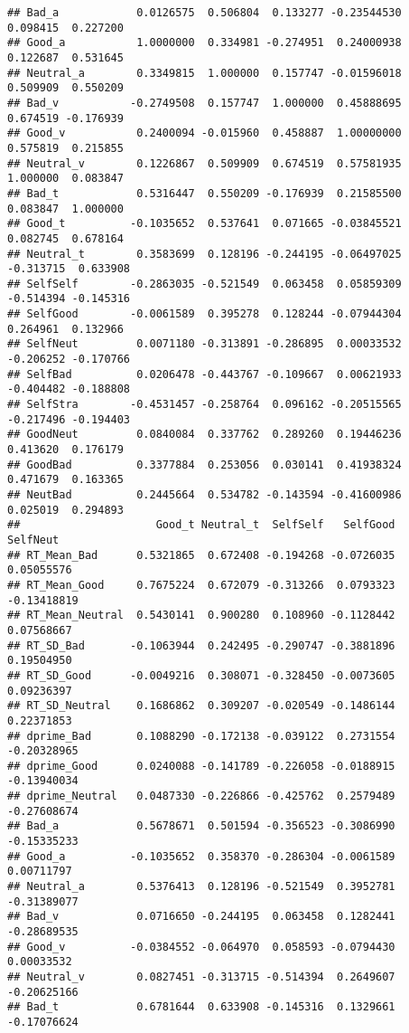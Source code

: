 \documentclass[man]{apa6}
\begin{document}
\begin{verbatim}
## Bad_a            0.0126575  0.506804  0.133277 -0.23544530  0.098415  0.227200
## Good_a           1.0000000  0.334981 -0.274951  0.24000938  0.122687  0.531645
## Neutral_a        0.3349815  1.000000  0.157747 -0.01596018  0.509909  0.550209
## Bad_v           -0.2749508  0.157747  1.000000  0.45888695  0.674519 -0.176939
## Good_v           0.2400094 -0.015960  0.458887  1.00000000  0.575819  0.215855
## Neutral_v        0.1226867  0.509909  0.674519  0.57581935  1.000000  0.083847
## Bad_t            0.5316447  0.550209 -0.176939  0.21585500  0.083847  1.000000
## Good_t          -0.1035652  0.537641  0.071665 -0.03845521  0.082745  0.678164
## Neutral_t        0.3583699  0.128196 -0.244195 -0.06497025 -0.313715  0.633908
## SelfSelf        -0.2863035 -0.521549  0.063458  0.05859309 -0.514394 -0.145316
## SelfGood        -0.0061589  0.395278  0.128244 -0.07944304  0.264961  0.132966
## SelfNeut         0.0071180 -0.313891 -0.286895  0.00033532 -0.206252 -0.170766
## SelfBad          0.0206478 -0.443767 -0.109667  0.00621933 -0.404482 -0.188808
## SelfStra        -0.4531457 -0.258764  0.096162 -0.20515565 -0.217496 -0.194403
## GoodNeut         0.0840084  0.337762  0.289260  0.19446236  0.413620  0.176179
## GoodBad          0.3377884  0.253056  0.030141  0.41938324  0.471679  0.163365
## NeutBad          0.2445664  0.534782 -0.143594 -0.41600986  0.025019  0.294893
##                     Good_t Neutral_t  SelfSelf   SelfGood    SelfNeut
## RT_Mean_Bad      0.5321865  0.672408 -0.194268 -0.0726035  0.05055576
## RT_Mean_Good     0.7675224  0.672079 -0.313266  0.0793323 -0.13418819
## RT_Mean_Neutral  0.5430141  0.900280  0.108960 -0.1128442  0.07568667
## RT_SD_Bad       -0.1063944  0.242495 -0.290747 -0.3881896  0.19504950
## RT_SD_Good      -0.0049216  0.308071 -0.328450 -0.0073605  0.09236397
## RT_SD_Neutral    0.1686862  0.309207 -0.020549 -0.1486144  0.22371853
## dprime_Bad       0.1088290 -0.172138 -0.039122  0.2731554 -0.20328965
## dprime_Good      0.0240088 -0.141789 -0.226058 -0.0188915 -0.13940034
## dprime_Neutral   0.0487330 -0.226866 -0.425762  0.2579489 -0.27608674
## Bad_a            0.5678671  0.501594 -0.356523 -0.3086990 -0.15335233
## Good_a          -0.1035652  0.358370 -0.286304 -0.0061589  0.00711797
## Neutral_a        0.5376413  0.128196 -0.521549  0.3952781 -0.31389077
## Bad_v            0.0716650 -0.244195  0.063458  0.1282441 -0.28689535
## Good_v          -0.0384552 -0.064970  0.058593 -0.0794430  0.00033532
## Neutral_v        0.0827451 -0.313715 -0.514394  0.2649607 -0.20625166
## Bad_t            0.6781644  0.633908 -0.145316  0.1329661 -0.17076624

\end{verbatim}
\end{document}

